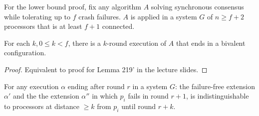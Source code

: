 For the lower bound proof, fix any algorithm $A$ solving synchronous consensus
while tolerating up to $f$ crash failures. $A$ is applied in a system $G$ of
$n \geq f+2$ processors that is at least $f+1$ connected.

\begin{lemma}
For each $k, 0 \leq k < f$, there is a $k$-round execution of $A$ that ends in
a bivalent configuration.
\end{lemma}

\begin{proof}
Equivalent to proof for Lemma 219' in the lecture slides.
\end{proof}

\begin{lemma} \label{lemma:indist_dist}
For any execution $\alpha$ ending after round $r$ in a system $G$: the failure-free
extension $\alpha'$ and the the extension $\alpha''$ in which $p_i$ fails in round $r+1$,
is indistinguishable to processors at distance $\geq k$ from $p_i$ until round $r+k$.
\end{lemma}

